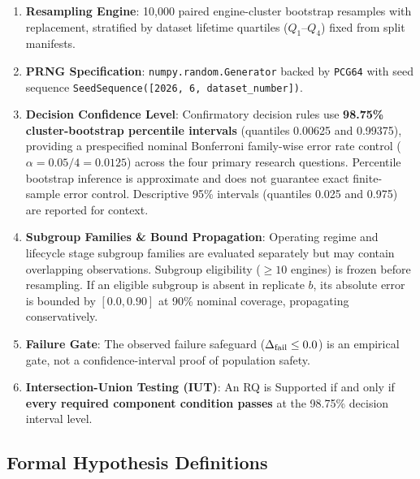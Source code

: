 \begin{enumerate}
  \item \textbf{Resampling Engine}: 10,000 paired engine-cluster bootstrap resamples with replacement, stratified by dataset lifetime quartiles ($Q_1$--$Q_4$) fixed from split manifests.
  \item \textbf{PRNG Specification}: \texttt{numpy.random.Generator} backed by \texttt{PCG64} with seed sequence \texttt{SeedSequence([2026, 6, dataset\_number])}.
  \item \textbf{Decision Confidence Level}: Confirmatory decision rules use \textbf{98.75\% cluster-bootstrap percentile intervals} (quantiles 0.00625 and 0.99375), providing a prespecified nominal Bonferroni family-wise error rate control ($\alpha = 0.05 / 4 = 0.0125$) across the four primary research questions. Percentile bootstrap inference is approximate and does not guarantee exact finite-sample error control. Descriptive 95\% intervals (quantiles 0.025 and 0.975) are reported for context.
  \item \textbf{Subgroup Families \& Bound Propagation}: Operating regime and lifecycle stage subgroup families are evaluated separately but may contain overlapping observations. Subgroup eligibility ($\ge 10$ engines) is frozen before resampling. If an eligible subgroup is absent in replicate $b$, its absolute error is bounded by $[0.0, 0.90]$ at 90\% nominal coverage, propagating conservatively.
  \item \textbf{Failure Gate}: The observed failure safeguard ($\Delta_{\text{fail}} \le 0.0$) is an empirical gate, not a confidence-interval proof of population safety.
  \item \textbf{Intersection-Union Testing (IUT)}: An RQ is Supported if and only if \textbf{every required component condition passes} at the 98.75\% decision interval level.
\end{enumerate}

\subsection*{Formal Hypothesis Definitions}

